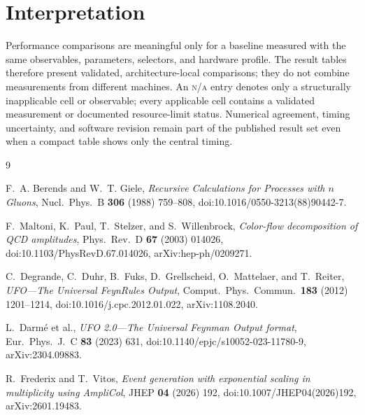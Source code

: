 \documentclass[10pt,letterpaper]{article}
\newcommand{\ReportNA}{\textcolor{ReportMuted}{\textsc{n/a}}}
\begin{document}
\section{Interpretation}

Performance comparisons are meaningful only for a baseline measured with the
same observables, parameters, selectors, and hardware profile. The result
tables therefore present validated, architecture-local comparisons; they do
not combine measurements from different machines. An \ReportNA{} entry denotes
only a structurally inapplicable cell or observable; every applicable cell
contains a validated measurement or documented resource-limit status.
Numerical agreement, timing uncertainty, and software revision remain part of
the published result set even when a compact table shows only the central
timing.

\clearpage

\clearpage

\clearpage

\clearpage



\clearpage
\begin{thebibliography}{9}

F.~A. Berends and W.~T. Giele,
\emph{Recursive Calculations for Processes with \(n\) Gluons},
Nucl.\ Phys.\ B \textbf{306} (1988) 759--808,
doi:10.1016/0550-3213(88)90442-7.

F.~Maltoni, K.~Paul, T.~Stelzer, and S.~Willenbrock,
\emph{Color-flow decomposition of QCD amplitudes},
Phys.\ Rev.\ D \textbf{67} (2003) 014026,
doi:10.1103/PhysRevD.67.014026,
arXiv:hep-ph/0209271.

C.~Degrande, C.~Duhr, B.~Fuks, D.~Grellscheid, O.~Mattelaer, and T.~Reiter,
\emph{UFO---The Universal FeynRules Output},
Comput.\ Phys.\ Commun.\ \textbf{183} (2012) 1201--1214,
doi:10.1016/j.cpc.2012.01.022,
arXiv:1108.2040.

L.~Darm\'e et al.,
\emph{UFO 2.0---The Universal Feynman Output format},
Eur.\ Phys.\ J.\ C \textbf{83} (2023) 631,
doi:10.1140/epjc/s10052-023-11780-9,
arXiv:2304.09883.

R.~Frederix and T.~Vitos,
\emph{Event generation with exponential scaling in multiplicity using
AmpliCol},
JHEP \textbf{04} (2026) 192,
doi:10.1007/JHEP04(2026)192,
arXiv:2601.19483.

\end{thebibliography}
\end{document}
